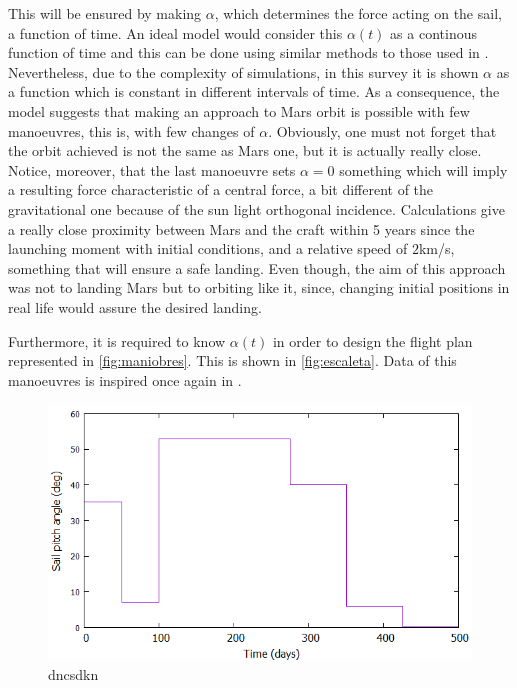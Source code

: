 \documentclass[twocolumn,12pt,a4paper]{article}
\numberwithin{equation}{section}
\begin{document}
This will be ensured by making $\alpha$, which determines the force acting on the sail, a function of time. An ideal model would consider this $\alpha(t)$ as a continous function of time and this can be done using similar methods to those used in \cite{xinos}. Nevertheless, due to the complexity of simulations, in this survey it is shown $\alpha$ as a function which is constant in different intervals of time. As a consequence, the model suggests that making an approach to Mars orbit is possible with few manoeuvres, this is, with few changes of $\alpha$. Obviously, one must not forget that the orbit achieved is not the same as Mars one, but it is actually really close. Notice, moreover, that the last manoeuvre sets $\alpha=0$ something which will imply a resulting force characteristic of a central force, a bit different of the gravitational one because of the sun light orthogonal incidence. Calculations give a really close proximity between Mars and the craft within 5 years since the launching moment with initial conditions, and a relative speed of $2$km/s, something that will ensure a safe landing. Even though, the aim of this approach was not to landing Mars but to orbiting like it, since, changing initial positions in real life would assure the desired landing.

Furthermore, it is required to know $\alpha(t)$ in order to design the flight plan represented in \autoref{fig:maniobres}. This is shown in \autoref{fig:escaleta}. Data of this manoeuvres is inspired once again in \cite{xinos}.
\begin{figure}
	\label{fig:escaleta}
	\includegraphics[scale=0.35]{cocu.png}
	\caption{dncsdkn}
\end{figure}
\clearpage


\end{document}
